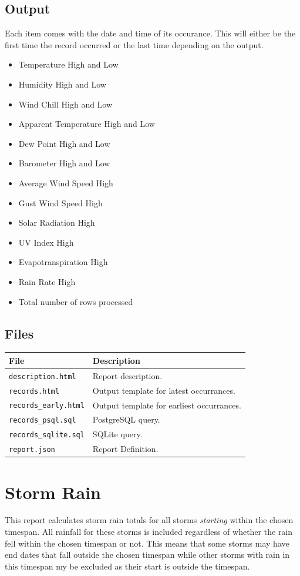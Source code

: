 \documentclass[a4paper,10pt]{book}
\begin{document}
\subsection{Output}
Each item comes with the date and time of its occurance. This will either be the first time the record occurred or the last time depending on the output.
\begin{itemize}
\item Temperature High and Low
\item Humidity High and Low
\item Wind Chill High and Low
\item Apparent Temperature High and Low
\item Dew Point High and Low
\item Barometer High and Low
\item Average Wind Speed High
\item Gust Wind Speed High
\item Solar Radiation High
\item UV Index High
\item Evapotranspiration High
\item Rain Rate High
\item Total number of rows processed
\end{itemize}

\subsection{Files}
\begin{tabular}{p{4.5cm} l}
\hline
\textbf{File} & \textbf{Description} \\
\hline
\verb|description.html| & Report description. \\
\verb|records.html| & Output template for latest occurrances.\\
\verb|records_early.html| & Output template for earliest occurrances.\\
\verb|records_psql.sql| & PostgreSQL query.\\
\verb|records_sqlite.sql| & SQLite query.\\
\verb|report.json| & Report Definition.\\
\hline
\end{tabular}

\section{Storm Rain}
This report calculates storm rain totals for all storms \emph{starting} within the chosen timespan. All rainfall for these storms is included regardless of whether the rain fell within the chosen timespan or not. This means that some storms may have end dates that fall outside the chosen timespan while other storms with rain in this timespan my be excluded as their start is outside the timespan.
\end{document}
